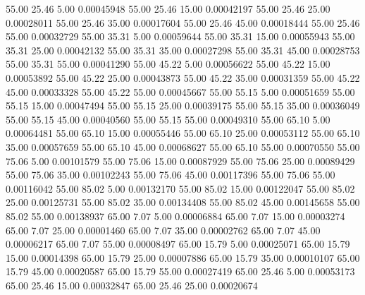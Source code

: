      55.00     25.46      5.00     0.00045948
     55.00     25.46     15.00     0.00042197
     55.00     25.46     25.00     0.00028011
     55.00     25.46     35.00     0.00017604
     55.00     25.46     45.00     0.00018444
     55.00     25.46     55.00     0.00032729
     55.00     35.31      5.00     0.00059644
     55.00     35.31     15.00     0.00055943
     55.00     35.31     25.00     0.00042132
     55.00     35.31     35.00     0.00027298
     55.00     35.31     45.00     0.00028753
     55.00     35.31     55.00     0.00041290
     55.00     45.22      5.00     0.00056622
     55.00     45.22     15.00     0.00053892
     55.00     45.22     25.00     0.00043873
     55.00     45.22     35.00     0.00031359
     55.00     45.22     45.00     0.00033328
     55.00     45.22     55.00     0.00045667
     55.00     55.15      5.00     0.00051659
     55.00     55.15     15.00     0.00047494
     55.00     55.15     25.00     0.00039175
     55.00     55.15     35.00     0.00036049
     55.00     55.15     45.00     0.00040560
     55.00     55.15     55.00     0.00049310
     55.00     65.10      5.00     0.00064481
     55.00     65.10     15.00     0.00055446
     55.00     65.10     25.00     0.00053112
     55.00     65.10     35.00     0.00057659
     55.00     65.10     45.00     0.00068627
     55.00     65.10     55.00     0.00070550
     55.00     75.06      5.00     0.00101579
     55.00     75.06     15.00     0.00087929
     55.00     75.06     25.00     0.00089429
     55.00     75.06     35.00     0.00102243
     55.00     75.06     45.00     0.00117396
     55.00     75.06     55.00     0.00116042
     55.00     85.02      5.00     0.00132170
     55.00     85.02     15.00     0.00122047
     55.00     85.02     25.00     0.00125731
     55.00     85.02     35.00     0.00134408
     55.00     85.02     45.00     0.00145658
     55.00     85.02     55.00     0.00138937
     65.00      7.07      5.00     0.00006884
     65.00      7.07     15.00     0.00003274
     65.00      7.07     25.00     0.00001460
     65.00      7.07     35.00     0.00002762
     65.00      7.07     45.00     0.00006217
     65.00      7.07     55.00     0.00008497
     65.00     15.79      5.00     0.00025071
     65.00     15.79     15.00     0.00014398
     65.00     15.79     25.00     0.00007886
     65.00     15.79     35.00     0.00010107
     65.00     15.79     45.00     0.00020587
     65.00     15.79     55.00     0.00027419
     65.00     25.46      5.00     0.00053173
     65.00     25.46     15.00     0.00032847
     65.00     25.46     25.00     0.00020674
